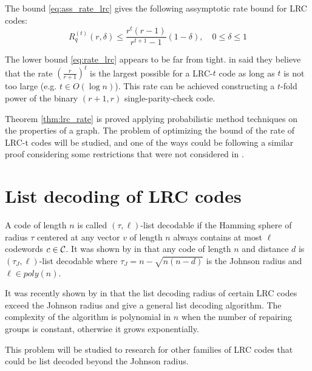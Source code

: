 The bound \ref{eq:ass_rate_lrc} gives the following assymptotic rate bound for LRC codes:
\begin{equation}
R_q^{(t)}(r,\delta) \leq \frac{r^t(r-1)}{r^{t+1}-1}(1-\delta), \quad 0 \leq \delta \leq 1
\end{equation}

The lower bound \ref{eq:rate_lrc} appears to be far from tight. \citeauthor{bounds_on_LRC_t} in \cite{bounds_on_LRC_t} said they believe that the rate $\left(\frac{r}{r+1}\right)^t$ is the largest possible for a LRC-$t$ code as long as $t$ is not too large (e.g. $t \in O(\log n)$). This rate can be achieved constructing a $t$-fold power of the binary $(r+1,r)$ single-parity-check code.

Theorem \ref{thm:lrc_rate} is proved applying probabilistic method techniques on the properties of a graph. The problem of optimizing the bound of the rate of LRC-t codes will be studied, and one of the ways could be following a similar proof considering some restrictions that were not considered in \cite{bounds_on_LRC}.


\section{List decoding of LRC codes}


A code of length $n$ is called $(\tau,\ell)$-list decodable if the Hamming sphere of radius $\tau$ centered at any vector $v$ of length $n$ always contains at most $\ell$ codewords $c \in {\mathcal C}$. It was shown by \citeauthor{list_decoding} in \cite{list_decoding} that any code of length $n$ and distance $d$ is $(\tau_J, \ell)$-list decodable where $\tau_J = n - \sqrt{n(n-d)}$ is the Johnson radius and $\ell \in poly(n)$.

It was recently shown by \citeauthor{list_decoding_LRC} in \cite{list_decoding_LRC} that the list decoding radius of certain LRC codes exceed the Johnson radius and give a general list decoding algorithm. The complexity of the algorithm is polynomial in $n$ when the number of repairing groups is constant, otherwise it grows exponentially.

This problem will be studied to research for other families of LRC codes that could be list decoded beyond the Johnson radius.